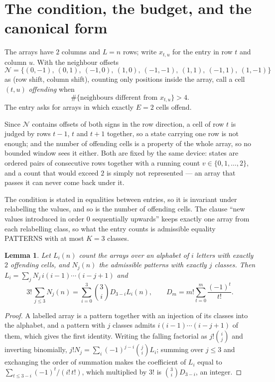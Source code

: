 \documentclass[11pt,a4paper]{article}
\theoremstyle{plain}
\newtheorem{lemma}[theorem]{Lemma}
\theoremstyle{definition}
\begin{document}
\section{The condition, the budget, and the canonical form}

The arrays have $2$ columns and $L=n$ rows; write $x_{t,u}$ for the entry in
row $t$ and column $u$. With the neighbour offsets
\[
\mathcal N=\{(0,-1),\ (0,1),\ (-1,0),\ (1,0),\ (-1,-1),\ (1,1),\ (-1,1),\ (1,-1)\}
\]
as (row shift, column shift), counting only positions inside the array, call a cell
$(t,u)$ \emph{offending} when
\[
\#\{\text{neighbours different from }x_{t,u}\}>4 .
\]
The entry asks for arrays in which exactly $E=2$ cells offend.

Since $\mathcal N$ contains offsets of both signs in the row direction, a cell of row
$t$ is judged by rows $t-1$, $t$ and $t+1$ together, so a state carrying one row is not
enough; and the number of offending cells is a property of the whole array, so no bounded
window sees it either. Both are fixed by the same device: states are ordered pairs of
consecutive rows together with a running count $v\in\{0,1,\dots,2\}$, and a count that
would exceed $2$ is simply not represented --- an array that passes it can never come back
under it.

The condition is stated in equalities between entries, so it is invariant under relabelling
the values, and so is the number of offending cells. The clause ``new values introduced in
order $0$ sequentially upwards'' keeps exactly one array from each relabelling class, so what
the entry counts is admissible equality PATTERNS with at most $K=3$ classes.

\begin{lemma}\label{lem:inv}
Let $L_i(n)$ count the arrays over an alphabet of $i$ letters with exactly $2$ offending
cells, and $N_j(n)$ the admissible patterns with exactly $j$ classes. Then
$L_i=\sum_j N_j\,i(i-1)\cdots(i-j+1)$ and
\[
3!\,\sum_{j\le3}N_j(n)=\sum_{i=0}^{3}\binom{3}{i}D_{3-i}L_i(n),
\qquad D_m=m!\sum_{t=0}^{m}\frac{(-1)^t}{t!} .
\]
\end{lemma}

\begin{proof}
A labelled array is a pattern together with an injection of its classes into the alphabet,
and a pattern with $j$ classes admits $i(i-1)\cdots(i-j+1)$ of them, which gives the first
identity. Writing the falling factorial as $j!\binom{i}{j}$ and inverting binomially,
$j!N_j=\sum_i(-1)^{j-i}\binom{j}{i}L_i$; summing over $j\le3$ and exchanging the
order of summation makes the coefficient of $L_i$ equal to
$\sum_{t\le3-i}(-1)^t/(i!\,t!)$, which multiplied by $3!$ is
$\binom{3}{i}D_{3-i}$, an integer.
\end{proof}
\end{document}
